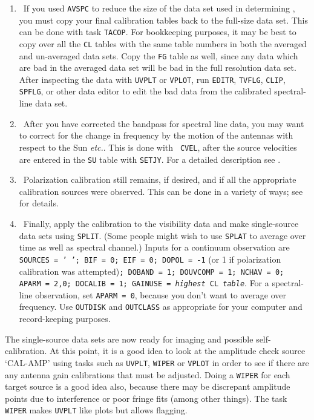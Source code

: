 
\begin{enumerate}

\item\ {If you used {\tt AVSPC} to reduce the size of the data set
used in determining , you must copy your final
calibration tables back to the full-size data set.  This can be done
with task {\tt TACOP}\@.  For bookkeeping purposes, it may be best to
copy over all the {\tt CL} tables with the same table numbers in both
the averaged and un-averaged data sets. Copy the {\tt FG} table as
well, since  any data which are bad in the averaged data set will be
bad in the full resolution data set.  After inspecting the data with
{\tt UVPLT} or {\tt VPLOT}, run {\tt EDITR}, {\tt TVFLG}, {\tt CLIP},
{\tt SPFLG}, or other data editor to edit the bad data from the
calibrated spectral-line data set.}

\item\ {After you have corrected the bandpass for spectral line data,
you may want to correct for the change in frequency by the motion of the
antennas with respect to the Sun {\it etc.}. This is done with {\tt
CVEL}, after the source velocities are entered in the {\tt SU} table
with {\tt SETJY}\@.  For a detailed description see \@.\@}

\item\ {Polarization calibration still remains, if desired, and if all
the appropriate calibration sources were observed.  This can be done
in a variety of ways; see  for details.}

\item\ {Finally, apply the calibration to the visibility data and make
single-source data sets using {\tt SPLIT}\@.  (Some people
might wish to use {\tt SPLAT} to average over time as well as spectral
channel.) Inputs for a continuum observation are {\tt SOURCES = '~';
BIF = 0; EIF = 0; DOPOL = -1} (or 1 if polarization calibration was
attempted){\tt ; DOBAND = 1; DOUVCOMP = 1; NCHAV = 0; APARM = 2,0;
DOCALIB = 1; GAINUSE = {\it highest} CL {\it table}}\@.  For a
spectral-line observation, set {\tt APARM = 0}, because you don't want to
average over frequency.  Use {\tt OUTDISK} and {\tt OUTCLASS} as
appropriate for your computer and record-keeping purposes.}

\end{enumerate}

The single-source data sets are now ready for imaging and possible
self-calibration.  At this point, it is a good idea to look at the
amplitude check source `CAL-AMP' using tasks such as {\tt UVPLT}, {\tt WIPER}
or {\tt VPLOT} in order to see if there are any antenna gain calibrations that
must be adjusted.  Doing a {\tt WIPER} for each target source is a
good idea also, because there may be discrepant amplitude points due
to interference or poor fringe fits (among other things).  The task
{\tt WIPER} makes {\tt UVPLT} like plots but allows flagging.

